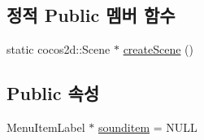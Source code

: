 \subsection*{정적 Public 멤버 함수}
\begin{DoxyCompactItemize}
\item 
static cocos2d\+::\+Scene $\ast$ \hyperlink{class_hello_world_a1b700f5f9de04271533d3fa099d7b014}{create\+Scene} ()
\end{DoxyCompactItemize}
\subsection*{Public 속성}
\begin{DoxyCompactItemize}
\item 
Menu\+Item\+Label $\ast$ \hyperlink{class_hello_world_adb09915c0ac4077d51f46e2645bc4c0a}{sounditem} = N\+U\+LL
\end{DoxyCompactItemize}
